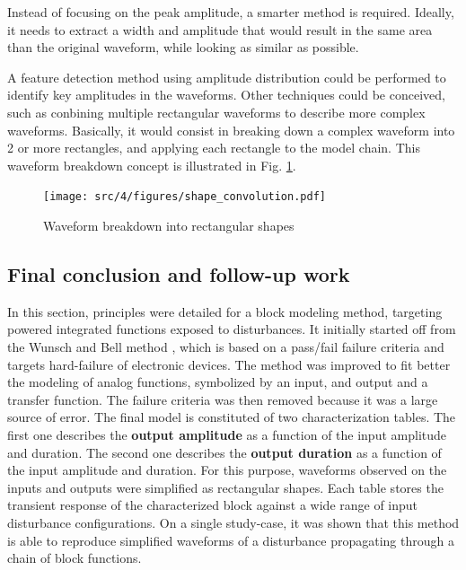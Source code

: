 Instead of focusing on the peak amplitude, a smarter method is required.
Ideally, it needs to extract a width and amplitude that would result in the same area than the original waveform, while looking as similar as possible.

A feature detection method using amplitude distribution could be performed to identify key amplitudes in the waveforms.
Other techniques could be conceived, such as conbining multiple rectangular waveforms to describe more complex waveforms.
Basically, it would consist in breaking down a complex waveform into 2 or more rectangles, and applying each rectangle to the model chain.
This waveform breakdown concept is illustrated in Fig. \ref{fig:waveform-deconvolution}.

\begin{figure}[!h]
  \centering
  \texttt{[image: src/4/figures/shape\_convolution.pdf]}
  \caption{Waveform breakdown into rectangular shapes}
  \label{fig:waveform-deconvolution}
\end{figure}

\subsection{Final conclusion and follow-up work}
\label{sec:limits-block-cz-final}

In this section, principles were detailed for a block modeling method, targeting powered integrated functions exposed to disturbances.
It initially started off from the Wunsch and Bell method \cite{wunsch-bell}, which is based on a pass/fail failure criteria and targets hard-failure of electronic devices.
The method was improved to fit better the modeling of analog functions, symbolized by an input, and output and a transfer function.
The failure criteria was then removed because it was a large source of error.
The final model is constituted of two characterization tables.
The first one describes the \textbf{output amplitude} as a function of the input amplitude and duration.
The second one describes the \textbf{output duration} as a function of the input amplitude and duration.
For this purpose, waveforms observed on the inputs and outputs were simplified as rectangular shapes.
Each table stores the transient response of the characterized block against a wide range of input disturbance configurations.
On a single study-case, it was shown that this method is able to reproduce simplified waveforms of a disturbance propagating through a chain of block functions.

